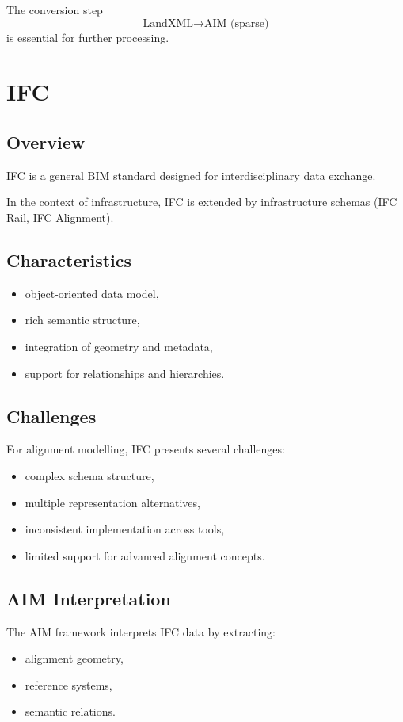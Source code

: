 The conversion step
\[
\text{LandXML} \rightarrow \text{AIM (sparse)}
\]
is essential for further processing.


\section{IFC}

\subsection{Overview}

IFC is a general BIM standard designed for interdisciplinary data
exchange.

In the context of infrastructure, IFC is extended by infrastructure
schemas (IFC Rail, IFC Alignment).

\subsection{Characteristics}

\begin{itemize}
\item object-oriented data model,
\item rich semantic structure,
\item integration of geometry and metadata,
\item support for relationships and hierarchies.
\end{itemize}

\subsection{Challenges}

For alignment modelling, IFC presents several challenges:
\begin{itemize}
\item complex schema structure,
\item multiple representation alternatives,
\item inconsistent implementation across tools,
\item limited support for advanced alignment concepts.
\end{itemize}

\subsection{AIM Interpretation}

The AIM framework interprets IFC data by extracting:
\begin{itemize}
\item alignment geometry,
\item reference systems,
\item semantic relations.
\end{itemize}


